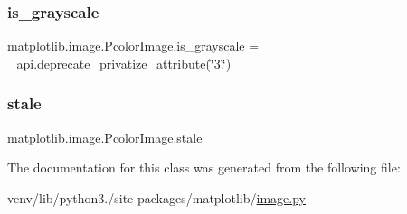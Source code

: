 \subsubsection{\texorpdfstring{is\+\_\+grayscale}{is\_grayscale}}
{\footnotesize\ttfamily matplotlib.\+image.\+Pcolor\+Image.\+is\+\_\+grayscale = \+\_\+api.\+deprecate\+\_\+privatize\+\_\+attribute(\char`\"{}3.\char`\"{})\hspace{0.3cm}{\ttfamily [static]}}

\mbox{\label{classmatplotlib_1_1image_1_1PcolorImage_a4932fc2a2e98f699033a0f74246c68cf}} 
\subsubsection{\texorpdfstring{stale}{stale}}
{\footnotesize\ttfamily matplotlib.\+image.\+Pcolor\+Image.\+stale}



The documentation for this class was generated from the following file\+:\begin{DoxyCompactItemize}
\item 
venv/lib/python3./site-\/packages/matplotlib/\hyperlink{image_8py}{image.\+py}\end{DoxyCompactItemize}
